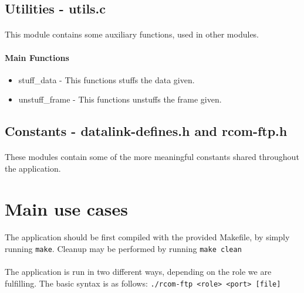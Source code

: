 \documentclass[11pt]{article}
\begin{document}
\subsection{Utilities - utils.c}

\paragraph{}This module contains some auxiliary functions, used in other modules.

\paragraph{Main Functions}

\begin{itemize}
        \item{stuff\_data - This functions stuffs the data given.}
        \item{unstuff\_frame - This functions unstuffs the frame given.}
\end{itemize}

\subsection{Constants - datalink-defines.h and rcom-ftp.h}

\paragraph{}These modules contain some of the more meaningful constants shared throughout the application.

\section{Main use cases}

\paragraph{}The application should be first compiled with the provided Makefile, by simply running
\verb|make|. Cleanup may be performed by running \verb|make clean|

\paragraph{}The application is run in two different ways, depending on the role we are fulfilling. The basic syntax is as follows: \verb|./rcom-ftp <role> <port> [file]|
\end{document}
